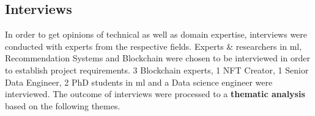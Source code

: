 
\subsection{Interviews}

In order to get opinions of technical as well as domain expertise, interviews were conducted with experts from the respective fields. Experts \& researchers in \gls{ml}, Recommendation Systems and Blockchain were chosen to be interviewed in order to establish project requirements. 3 Blockchain experts, 1 NFT Creator, 1 Senior Data Engineer, 2 PhD students in \gls{ml} and a Data science engineer were interviewed.
The outcome of interviews were processed to a \textbf{thematic analysis} based on the following themes.


